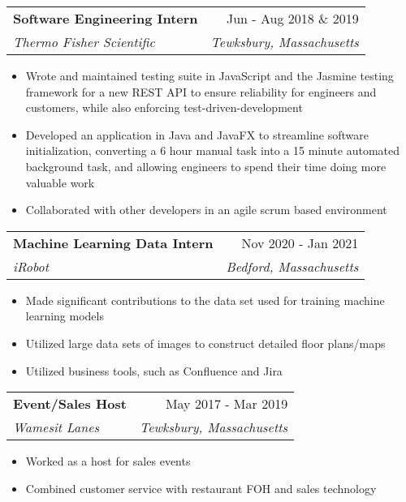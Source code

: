 \documentclass[letterpaper,11pt]{article}
\makeatletter
\newcommand{\resumeItem}[1]{
  \item\small{
    {#1 \vspace{-2pt}}
  }
}
\newcommand{\resumeSubheading}[4]{
  \vspace{-2pt}\item
    \begin{tabular*}{0.97\textwidth}[t]{l@{\extracolsep{\fill}}r}
      \textbf{#1} & #2 \\
      \textit{\small#3} & \textit{\small #4} \\
    \end{tabular*}\vspace{-7pt}
}
\newcommand{\resumeSubSubheading}[2]{
    \item
    \begin{tabular*}{0.97\textwidth}{l@{\extracolsep{\fill}}r}
      \textit{\small#1} & \textit{\small #2} \\
    \end{tabular*}\vspace{-7pt}
}
\newcommand{\resumeSubHeadingListEnd}{\end{itemize}}
\newcommand{\resumeItemListStart}{\begin{itemize}}
\newcommand{\resumeItemListEnd}{\end{itemize}\vspace{-5pt}}
\makeatother
\begin{document}
    \resumeSubheading
      {Software Engineering Intern}{Jun - Aug 2018 \& 2019}
      {Thermo Fisher Scientific}{Tewksbury, Massachusetts}
      \resumeItemListStart
        \resumeItem{Wrote and maintained testing suite in JavaScript and the Jasmine testing framework for a new REST API to ensure reliability for engineers and customers, while also enforcing test-driven-development}
        \resumeItem{Developed an application in Java and JavaFX to streamline software initialization, converting a 6 hour manual task into a 15 minute automated background task, and allowing engineers to spend their time doing more valuable work}
        \resumeItem{Collaborated with other developers in an agile scrum based environment}
      \resumeItemListEnd

    \resumeSubheading
      {Machine Learning Data Intern}{Nov 2020 - Jan 2021}
      {iRobot}{Bedford, Massachusetts}
      \resumeItemListStart
        \resumeItem{Made significant contributions to the data set used for training machine learning models}
        \resumeItem{Utilized large data sets of images to construct detailed floor plans/maps}
        \resumeItem{Utilized business tools, such as Confluence and Jira}
    \resumeItemListEnd
    \resumeSubheading{Event/Sales Host}{May 2017 - Mar 2019}{Wamesit Lanes}{Tewksbury, Massachusetts}
        \resumeItemListStart
            \resumeItem{Worked as a host for sales events}
            \resumeItem{Combined customer service with restaurant FOH and sales technology}
  \resumeSubHeadingListEnd


\end{document}
